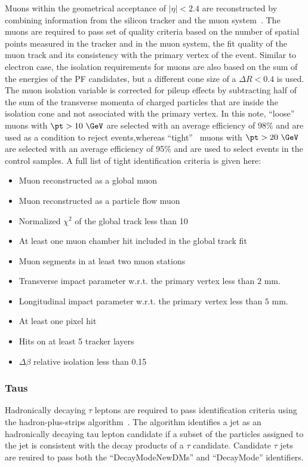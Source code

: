 Muons within the geometrical acceptance of $|\eta| < 2.4$ are reconstructed by combining information from the silicon tracker 
and the muon system~\cite{Chatrchyan:2012xi}. The muons are required to pass set of quality criteria based on the number of spatial 
points measured in the tracker and in the muon system, the fit quality of the muon track and its consistency with the primary vertex 
of the event. Similar to electron case, the isolation requirements for muons are also based on the sum of the energies of the PF candidates, 
but a different cone size of a $\Delta R < 0.4$ is used. The muon isolation variable is corrected for pileup effects by subtracting half 
of the sum of the transverse momenta of charged particles that are inside the isolation cone and not associated with the primary vertex. 
In this note, ``loose''~\cite{CMS-MUO-TWIKI-IDLOOSE} muons with $\pt>10~\GeV$ are selected with an average efficiency of 98\% and 
are used as a condition to reject events,whereas ``tight''~\cite{CMS-MUO-TWIKI-IDTIGHT} muons with $\pt>20~\GeV$ are selected with an 
average efficiency of 95\% and are used to select events in the control samples. 
A full list of tight identification criteria is given here:

\begin{itemize}
\item Muon reconstructed as a global muon
\item Muon reconstructed as a particle flow muon
\item Normalized $\chi^2$ of the global track less than 10
\item At least one muon chamber hit included in the global track fit
\item Muon segments in at least two muon stations
\item Transverse impact parameter w.r.t. the primary vertex less than $2$ mm.
\item Longitudinal impact parameter w.r.t. the primary vertex less than $5$ mm.
\item At least one pixel hit
\item Hits on at least 5 tracker layers
\item $\Delta\beta$ relative isolation less than 0.15
\end{itemize}

\subsubsection{Taus}

Hadronically decaying $\tau$ leptons are required to pass identification criteria
using the hadron-plus-strips algorithm~\cite{Khachatryan:2015dfa}. The algorithm
identifies a jet as an hadronically decaying tau lepton candidate if a subset of the
particles assigned to the jet is consistent with the decay products of a $\tau$ candidate.
Candidate $\tau$ jets are reuired to pass both the ``DecayModeNewDMs'' and ``DecayMode'' identifiers.

